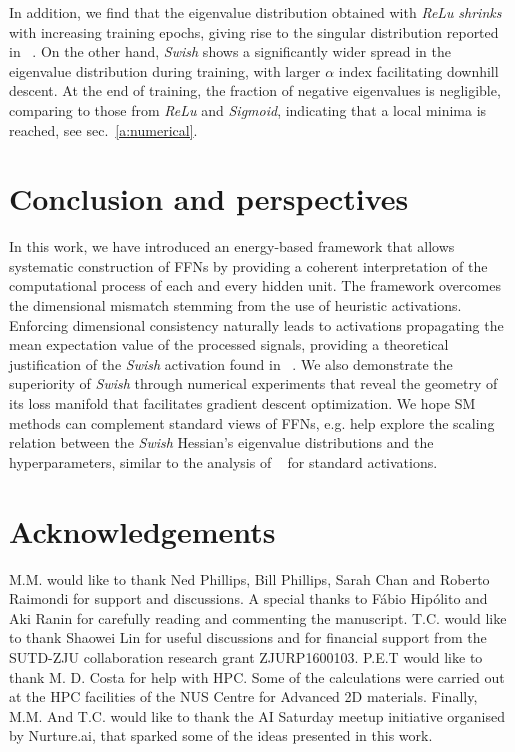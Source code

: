 \documentclass{article}
\begin{document}
%
In addition, we find that the eigenvalue distribution obtained with {\it ReLu}  {\it shrinks} with increasing training epochs, giving rise to the singular distribution reported in ~\cite{penn1, levent}. On the other hand, {\it Swish} shows a significantly wider spread in the eigenvalue distribution during training, with larger $\alpha$ index facilitating downhill descent. At the end of training, the fraction of negative eigenvalues is negligible, comparing to those from {\it ReLu} and {\it Sigmoid}, indicating that a local minima is reached, see sec.~\eqref{a:numerical}.


\section{Conclusion and perspectives}
%
In this work, we have introduced an energy-based framework that allows systematic construction of FFNs by providing a coherent interpretation of the computational process of each and every hidden unit. The framework overcomes the dimensional mismatch stemming from the use of heuristic activations. Enforcing dimensional consistency naturally leads to activations propagating the mean expectation value of the processed signals, providing a theoretical justification of the \textit{Swish} activation found in ~\cite{prajit}. We also demonstrate the superiority of {\it Swish} through numerical experiments that reveal the geometry of its loss manifold that facilitates gradient descent optimization. We hope SM methods can complement standard views of FFNs, e.g. help explore the scaling relation between the {\it Swish} Hessian's eigenvalue distributions and the hyperparameters, similar to the analysis of ~\cite{penn1} for standard activations.

\section{Acknowledgements}

M.M. would like to thank Ned Phillips, Bill Phillips, Sarah Chan and Roberto Raimondi for support and discussions. A special thanks to  F\'abio Hip\'olito and Aki Ranin for carefully reading and commenting the manuscript. T.C. would like to thank Shaowei Lin for useful discussions and for financial support from the SUTD-ZJU collaboration research grant ZJURP1600103. P.E.T would like to thank M. D. Costa for help with HPC. Some of the calculations were carried out at the HPC facilities of the NUS Centre for Advanced 2D materials. Finally, M.M. And T.C. would like to thank the AI Saturday meetup initiative organised by Nurture.ai, that sparked some of the ideas presented in this work.
\end{document}
